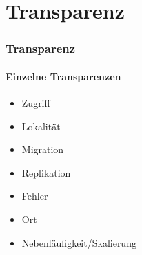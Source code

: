\section{Transparenz}
\begin{frame}
  \frametitle{Transparenz}
  \framesubtitle{Einzelne Transparenzen}
  \begin{itemize}
    \item Zugriff
    \item Lokalität
    \item Migration
    \item Replikation
    \item Fehler
    \item Ort
    \item Nebenläufigkeit/Skalierung
  \end{itemize}
\end{frame}
